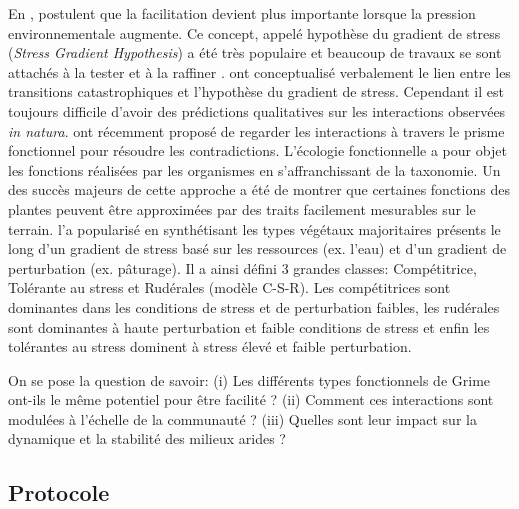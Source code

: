 \documentclass[12pt]{article} %
\begin{document}
En \citeyear{Bertness1994}, \citeauthor{Bertness1994} postulent que la facilitation devient plus importante lorsque la pression environnementale augmente. Ce concept, appelé hypothèse du gradient de stress (\textit{Stress Gradient Hypothesis}) a été très populaire et beaucoup de travaux se sont attachés à la tester et à la raffiner \citep{ Anthelme2007,Maestre2009,He2013}. \citet{Verwijmeren2013} ont conceptualisé verbalement le lien entre les transitions catastrophiques et l'hypothèse du gradient de stress. Cependant il est toujours difficile d'avoir des prédictions qualitatives sur les interactions observées \textit{in natura}. \citet{Butterfield2013} ont récemment proposé de regarder les interactions à travers le prisme fonctionnel pour résoudre les contradictions. L'écologie fonctionnelle a pour objet les fonctions réalisées par les organismes en s'affranchissant de la taxonomie. Un des succès majeurs de cette approche a été de montrer que certaines fonctions des plantes peuvent être approximées par des traits facilement mesurables sur le terrain. \citet{Grime1977a} l'a popularisé en synthétisant les types végétaux majoritaires présents le long d'un gradient de stress basé sur les ressources (ex. l'eau) et d'un gradient de perturbation (ex. pâturage). Il a ainsi défini 3 grandes classes: Compétitrice, Tolérante au stress et Rudérales (modèle C-S-R). Les compétitrices sont dominantes dans les conditions de stress et de perturbation faibles, les rudérales sont dominantes à haute perturbation et faible conditions de stress et enfin les tolérantes au stress dominent à stress élevé et faible perturbation.

On se pose la question de savoir: (i) Les différents types fonctionnels de Grime ont-ils le même potentiel pour être facilité ? (ii) Comment ces interactions sont modulées à l'échelle de la communauté ? (iii) Quelles sont leur impact sur la dynamique et la stabilité des milieux arides ?

\subsection{Protocole}
\end{document}
